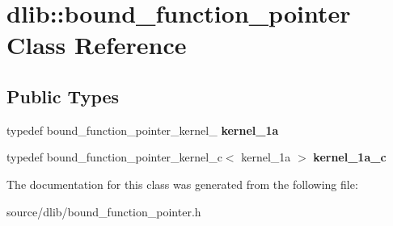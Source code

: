 \hypertarget{classdlib_1_1bound__function__pointer}{
\section{dlib::bound\_\-function\_\-pointer Class Reference}
\label{classdlib_1_1bound__function__pointer}
}
\subsection*{Public Types}
\begin{DoxyCompactItemize}
\item 
\hypertarget{classdlib_1_1bound__function__pointer_a533e9b1ab4f8a99f21d07d28b30675b1}{
typedef bound\_\-function\_\-pointer\_\-kernel\_ {\bfseries kernel\_\-1a}}
\label{classdlib_1_1bound__function__pointer_a533e9b1ab4f8a99f21d07d28b30675b1}

\item 
\hypertarget{classdlib_1_1bound__function__pointer_acb74e7ca7d63a6d0ec3cf88c4df35e5e}{
typedef bound\_\-function\_\-pointer\_\-kernel\_\-c$<$ kernel\_\-1a $>$ {\bfseries kernel\_\-1a\_\-c}}
\label{classdlib_1_1bound__function__pointer_acb74e7ca7d63a6d0ec3cf88c4df35e5e}

\end{DoxyCompactItemize}


The documentation for this class was generated from the following file:\begin{DoxyCompactItemize}
\item 
source/dlib/bound\_\-function\_\-pointer.h\end{DoxyCompactItemize}
